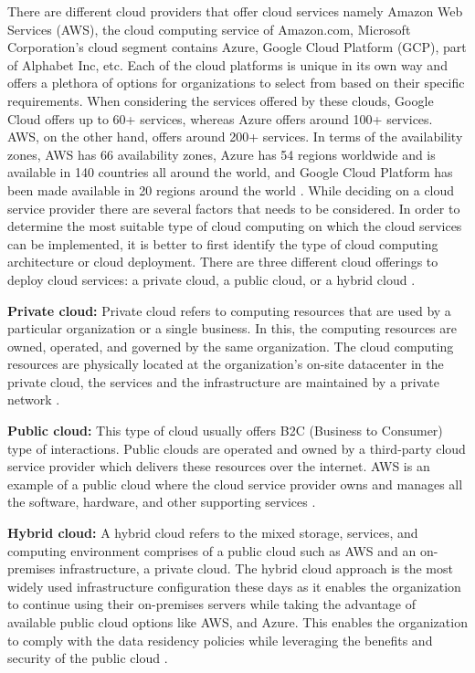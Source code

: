 \par There are different cloud providers that offer cloud services namely Amazon Web Services (AWS), the cloud computing service of Amazon.com, Microsoft Corporation’s cloud segment contains Azure, Google Cloud Platform (GCP), part of Alphabet Inc, etc.
Each of the cloud platforms is unique in its own way and offers a plethora of options for organizations to select from based on their specific requirements.
When considering the services offered by these clouds,
Google Cloud offers up to 60+ services, whereas Azure
offers around 100+ services.
AWS, on the other hand, offers around 200+ services.
In terms of the availability zones, AWS has 66 availability zones, Azure has 54 regions worldwide and is available in 140 countries all around the world, and Google Cloud Platform has been made available in 20 regions around the world \cite{13}.
While deciding on a cloud service provider there are
several factors that needs to be considered.
In order to determine the most suitable type of cloud computing on which the cloud services can be implemented, it is better to first identify the type of cloud computing architecture or cloud deployment.
There are three different cloud offerings to deploy cloud services: a private cloud, a public cloud, or a hybrid cloud \cite{14}.

\textbf{Private cloud:}
Private cloud refers to computing resources that are used by a particular organization or a single business.
In this,
the computing resources are owned, operated, and governed by the same organization.
The cloud
computing resources are physically located at the
organization’s on-site datacenter in the private cloud, the
services
and
the
infrastructure are maintained by a private network \cite{14}.

\textbf{Public cloud:}
This type of cloud usually offers B2C (Business to Consumer) type of interactions. Public clouds are operated and
owned by a third-party cloud service provider which delivers these resources over the internet. AWS is an example of
a public cloud where the cloud service provider owns and manages all the software, hardware, and other supporting
services \cite{14}.

\textbf{Hybrid cloud:}
A hybrid cloud refers to the mixed storage, services, and computing environment comprises of a public cloud such as
AWS and an on-premises infrastructure, a private cloud. The hybrid cloud approach is the most widely used infrastructure configuration these days as it enables the organization
to continue using their on-premises servers while taking the advantage of available public cloud options like AWS,
and Azure. This enables the organization to comply with the data residency policies while leveraging the benefits and
security of the public cloud \cite{14}.


